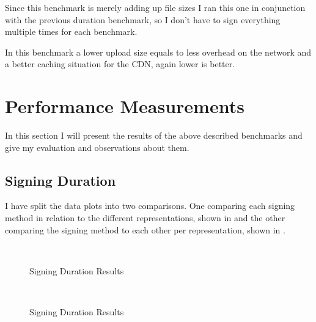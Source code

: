 Since this benchmark is merely adding up file sizes I ran this one in conjunction with the previous duration benchmark, so I don't have to sign everything multiple times for each benchmark.

In this benchmark a lower upload size equals to less overhead on the network and a better caching situation for the CDN, again lower is better.

\section{Performance Measurements\label{sec:performance}}

In this section I will present the results of the above described benchmarks and give my evaluation and observations about them.

\subsection{Signing Duration}

I have split the data plots into two comparisons. One comparing each signing method in relation to the different representations, shown in  and the other comparing the signing method to each other per representation, shown in .


\begin{figure}
    \centering
     \\
    \caption{Signing Duration Results}
    \label{fig:sign-dur1}
\end{figure}

\begin{figure}
    \centering
     \\
    \caption{Signing Duration Results}
    \label{fig:sign-dur2}
\end{figure}

